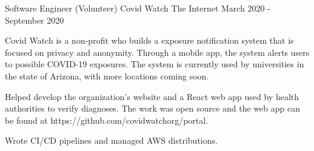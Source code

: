 

\begin{cventries}

  \cventry
  {Software Engineer (Volunteer)} %
    {Covid Watch} %
    {The Internet}
    {March 2020 - September 2020 } %
    {
      \begin{cvitems} %
      \item {Covid Watch is a non-profit who builds a exposure notification system that is focused on privacy and anonymity. Through a mobile app, the system alerts users to possible COVID-19 exposures. The system is currently used by universities in the state of Arizona, with more locations coming soon.}
      \item {Helped develop the organization's website and a React web app used by health authorities to verify diagnoses. The work was open source and the web app can be found at https://github.com/covidwatchorg/portal.}
      \item {Wrote CI/CD pipelines and managed AWS distributions.}
      \end{cvitems}
    }


\end{cventries}
